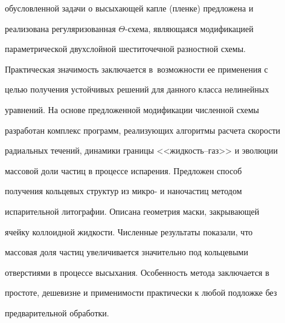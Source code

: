 обусловленной задачи о высыхающей капле (пленке) предложена и

реализована регуляризованная $\Theta$-схема, являющаяся модификацией

параметрической двухслойной шеститочечной разностной схемы.

Практическая значимость заключается в~возможности ее применения с

целью получения устойчивых решений для данного класса нелинейных

уравнений. На основе предложенной модификации численной схемы

разработан комплекс программ, реализующих алгоритмы расчета скорости

радиальных течений, динамики границы <<жидкость--газ>> и эволюции

массовой доли частиц в процессе испарения. Предложен способ

получения кольцевых структур из микро- и наночастиц методом

испарительной литографии. Описана геометрия маски, закрывающей

ячейку коллоидной жидкости. Численные результаты показали, что

массовая доля частиц увеличивается значительно под кольцевыми

отверстиями в процессе высыхания. Особенность метода заключается в

простоте, дешевизне и применимости практически к любой подложке без

предварительной обработки.



\pagebreak












